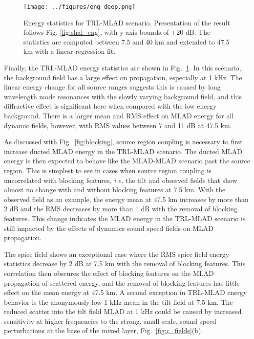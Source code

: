 \documentclass[preprint,NumberedRefs]{JASA}
\begin{document}
\begin{figure}
\texttt{[image: ../figures/eng\_deep.png]}
    \caption{Energy statistics for TRL-MLAD scenario. Presentation of the result follows Fig. \ref{fig:shal_eng}, with y-axis bounds of $\pm$20 dB. The statistics are computed between 7.5 and 40 km and extended to 47.5 km with a linear regression fit.}
    \label{fig:deep_eng}
\end{figure}
Finally, the TRL-MLAD energy statistics are shown in Fig.~\ref{fig:deep_eng}. In this scenario, the background field has a large effect on propagation, especially at 1 kHz. The linear energy change for all source ranges suggests this is caused by long wavelength mode resonances with the slowly varying background field\cite{colosi21}, and this diffractive effect is significant here when compared with the low energy background. There is a larger mean and RMS effect on MLAD energy for all dynamic fields, however, with RMS values between 7 and 11 dB at 47.5 km.

As discussed with Fig.~\ref{fig:blocking}, source region coupling is necessary to first increase ducted MLAD energy in the TRL-MLAD scenario. The ducted MLAD energy is then expected to behave like the MLAD-MLAD scenario past the source region. This is simplest to see in cases when source region coupling is uncorrelated with blocking features, \emph{i.e.} the tilt and observed fields that show almost no change with and without blocking features at 7.5 km. With the observed field as an example, the energy mean at 47.5 km increases by more than 2 dB and the RMS decreases by more than 1 dB with the removal of blocking features. This change indicates the MLAD energy in the TRL-MLAD scenario is still impacted by the effects of dynamics sound speed fields on MLAD propagation.

The spice field shows an exceptional case where the RMS spice field energy statistics decrease by 2 dB at 7.5 km with the removal of blocking features. This correlation then obscures the effect of blocking features on the MLAD propagation of scattered energy, and the removal of blocking features has little effect on the mean energy at 47.5 km. A second exception in TRL-MLAD energy behavior is the anonymously low 1 kHz mean in the tilt field at 7.5 km. The reduced scatter into the tilt field MLAD at 1 kHz could be caused by increased sensitivity at higher frequencies to the strong, small scale, sound speed perturbations at the base of the mixed layer, Fig.~\ref{fig:c_fields}(b).
\end{document}
